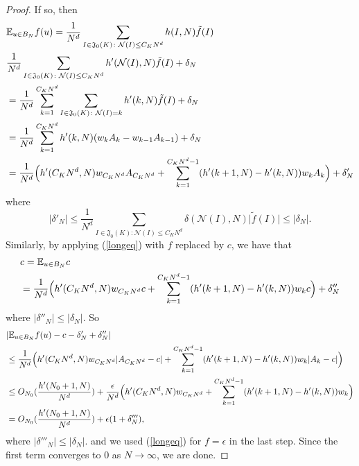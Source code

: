 \documentclass[11pt]{amsart}
\theoremstyle{definition}
\newcommand{\NN}{{\mathcal N}}
\newcommand{\e}{\epsilon}
\begin{document}
\begin{proof}
     If so,
    then 
    \begin{equation}\label{longeq}
        \begin{split}
            & \mathbb{E}_{u\in B_{N}}f(u)
            =\frac{1}{N^{d}}\sum_{I\in\mathfrak{J}_{0}(K)\colon\NN(I)\leq C_{K}N^{d}}h(I,N)\tilde{f}(I)
            \\&\frac{1}{N^{d}}\sum_{I\in\mathfrak{J}_{0}(K)\colon\NN(I)\leq C_{K}N^{d}}h'(\NN(I),N)\tilde{f}(I)+\delta_{N}
            \\&=\frac{1}{N^{d}}\sum_{k=1}^{C_{K}N^{d}}\sum_{I\in\mathfrak{J}_{0}(K)\colon\NN(I)=k}h'(k,N)\tilde{f}(I)+\delta_{N}
            \\&=\frac{1}{N^{d}}\sum_{k=1}^{C_{K}N^{d}}h'(k,N)(w_{k}A_{k}-w_{k-1}A_{k-1})+\delta_{N}
            \\&=\frac{1}{N^{d}}\Bigl(h'(C_{K}N^{d},N)w_{C_{K}N^{d}}A_{C_{K}N^{d}}+\sum_{k=1}^{C_{K}N^{d}-1}(h'(k+1,N)-h'(k,N))w_{k}A_{k}\Bigr)+\delta'_{N}
        \end{split}
    \end{equation}
where
$$\vert\delta'_{N}\vert\leq\frac{1}{N^{d}}\sum_{I\in\mathfrak{J}_{0}(K)\colon\NN(I)\leq C_{K}N^{d}}\delta(\NN(I),N)\vert\tilde{f}(I)\vert\leq \vert\delta_{N}\vert.$$
 Similarly, by applying (\ref{longeq}) with $f$ replaced by $c$, we have that 
   \begin{equation*}
        \begin{split}
            & c=\mathbb{E}_{u\in B_{N}}c
            \\&=\frac{1}{N^{d}}\Bigl(h'(C_{K}N^{d},N)w_{C_{K}N^{d}}c+\sum_{k=1}^{C_{K}N^{d}-1}(h'(k+1,N)-h'(k,N))w_{k}c\Bigr)+\delta''_{N}
        \end{split}
    \end{equation*}
    where
$\vert\delta''_{N}\vert\leq \vert\delta_{N}\vert.$
So
   \begin{equation*}
        \begin{split}
            & \vert\mathbb{E}_{u\in B_{N}}f(u)-c-\delta'_{N}+\delta''_{N}\vert
            \\&\leq\frac{1}{N^{d}}\Bigl(h'(C_{K}N^{d},N)w_{C_{K}N^{d}}\vert A_{C_{K}N^{d}}-c\vert+\sum_{k=1}^{C_{K}N^{d}-1}(h'(k+1,N)-h'(k,N))w_{k}\vert A_{k}-c\vert\Bigr)
            \\&\leq O_{N_{0}}(\frac{h'(N_{0}+1,N)}{N^{d}})+\frac{\e}{N^{d}}\Bigl(h'(C_{K}N^{d},N)w_{C_{K}N^{d}}+\sum_{k=1}^{C_{K}N^{d}-1}(h'(k+1,N)-h'(k,N))w_{k}\Bigr)
            \\&=O_{N_{0}}(\frac{h'(N_{0}+1,N)}{N^{d}})+\e(1+\delta'''_{N}),
        \end{split}
    \end{equation*}
    where $\vert\delta'''_{N}\vert\leq \vert\delta_{N}\vert.$
    and we used (\ref{longeq}) for $f=\e$ in the last step. 
    Since the first term  converges to 0 as $N\to\infty$, we are done.
\end{proof}
\end{document}
